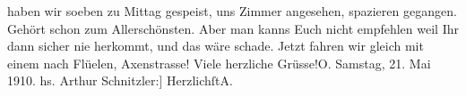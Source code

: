 \begin{ledgroupsized}[t]{13cm}
           \pstart
           {\pb}\label{K_L02559-1v}\label{K_L02559-1h} haben wir soeben zu Mittag gespeist, uns Zimmer
               angesehen, spazieren gegangen. Gehört schon zum Allerschönsten. Aber man kanns Euch
               nicht empfehlen weil Ihr dann sicher nie herkommt, und das wäre schade. Jetzt fahren
               wir gleich mit einem \label{K_L02559-2v}\label{K_L02559-2h} nach Flüelen, Axenstrasse!\pend
           \pstart Viele herzliche Grüsse!\spacefill\mbox{O.}\pend{}\pstart
           {\pb}Samstag, 21. Mai 1910.\pend
           \pstart {[}hs. Arthur Schnitzler:{]} Herzlichſt\spacefill\mbox{A.}\pend{}
         
         \endnumbering{}\end{ledgroupsized}  \newcommand{\dateiname}{L02559}\newcommand{\titel}{Olga und Arthur Schnitzler an Richard und Paula Beer-Hofmann, 21. 5. 1910}\newcommand{\editorInnen}{Martin Anton Müller und Gerd-Hermann Susen}
      
